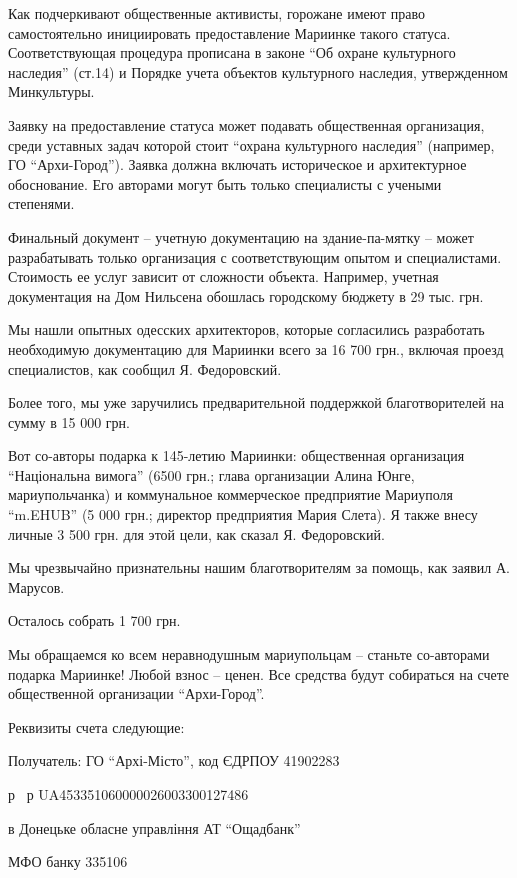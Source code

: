 Как подчеркивают общественные активисты, горожане имеют право самостоятельно
инициировать предоставление Мариинке такого статуса. Соответствующая процедура
прописана в законе \enquote{Об охране культурного наследия} (ст.14) и Порядке учета
объектов культурного наследия, утвержденном Минкультуры.

Заявку на предоставление статуса может подавать общественная организация, среди
уставных задач которой стоит \enquote{охрана культурного наследия} (например,
ГО \enquote{Архи-Город}). Заявка должна включать историческое и архитектурное
обоснование.  Его авторами могут быть только специалисты с учеными степенями.

Финальный документ – учетную документацию на здание-па\hyp{}мятку – может
разрабатывать только организация с соответствующим опытом и специалистами.
Стоимость ее услуг зависит от сложности объекта. Например, учетная документация
на Дом Нильсена обошлась городскому бюджету в 29 тыс. грн.

Мы нашли опытных одесских архитекторов, которые согласились разработать
необходимую документацию для Мариинки всего за 16 700 грн., включая проезд
специалистов, как сообщил Я. Федоровский. 

Более того, мы уже заручились предварительной поддержкой благотворителей на сумму в 15 000 грн.

Вот со-авторы подарка к 145-летию Мариинки: общественная организация
\enquote{Національна вимога} (6500 грн.; глава организации Алина Юнге, мариупольчанка)
и коммунальное коммерческое предприятие Мариуполя \enquote{m.EHUB} (5 000 грн.;
директор предприятия Мария Слета). Я также внесу личные 3 500 грн. для этой
цели, как сказал Я. Федоровский.

Мы чрезвычайно признательны нашим благотворителям за помощь, как заявил А. Марусов.

Осталось собрать 1 700 грн.

Мы обращаемся ко всем неравнодушным мариупольцам – станьте со-авторами подарка
Мариинке! Любой взнос – ценен. Все средства будут собираться на счете
общественной организации \enquote{Архи-Город}.

Реквизиты счета следующие: 

Получатель: ГО \enquote{Архі-Місто}, код ЄДРПОУ 41902283

р \ р UA453351060000026003300127486 

в Донецьке обласне управління АТ \enquote{Ощадбанк}

МФО банку 335106

